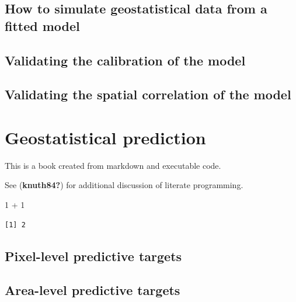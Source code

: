\documentclass[
  letterpaper,
]{krantz}
\newenvironment{Shaded}{\begin{snugshade}}{\end{snugshade}}
\newcommand{\DecValTok}[1]{\textcolor[rgb]{0.68,0.00,0.00}{#1}}
\newcommand{\SpecialCharTok}[1]{\textcolor[rgb]{0.37,0.37,0.37}{#1}}
\begin{document}
\hypertarget{how-to-simulate-geostatistical-data-from-a-fitted-model}{%
\section{How to simulate geostatistical data from a fitted
model}\label{how-to-simulate-geostatistical-data-from-a-fitted-model}}

\hypertarget{validating-the-calibration-of-the-model}{%
\section{Validating the calibration of the
model}\label{validating-the-calibration-of-the-model}}

\hypertarget{validating-the-spatial-correlation-of-the-model}{%
\section{Validating the spatial correlation of the
model}\label{validating-the-spatial-correlation-of-the-model}}


\hypertarget{sec-geo-prediction}{%
\chapter{Geostatistical prediction}\label{sec-geo-prediction}}

This is a book created from markdown and executable code.

See (\textbf{knuth84?}) for additional discussion of literate
programming.

\begin{Shaded}
\begin{Highlighting}[]
\DecValTok{1} \SpecialCharTok{+} \DecValTok{1}
\end{Highlighting}
\end{Shaded}

\begin{verbatim}
[1] 2
\end{verbatim}

\hypertarget{pixel-level-predictive-targets}{%
\section{Pixel-level predictive
targets}\label{pixel-level-predictive-targets}}

\hypertarget{area-level-predictive-targets}{%
\section{Area-level predictive
targets}\label{area-level-predictive-targets}}
\end{document}

